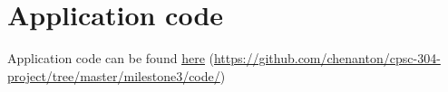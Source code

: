 \setcounter{section}{1}
\section{Application code}

Application code can be found \href{https://github.com/chenanton/cpsc-304-project/tree/master/milestone3/code/}{\underline{here}} (\url{https://github.com/chenanton/cpsc-304-project/tree/master/milestone3/code/})
